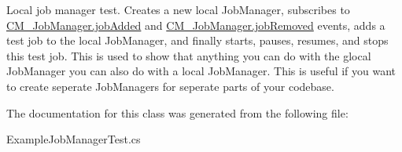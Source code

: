 Local job manager test. Creates a new local Job\+Manager, subscribes to \hyperlink{class_c_m___job_manager_a0f3c4dff8b782e1b64abcbb7dc19cd8a}{C\+M\+\_\+\+Job\+Manager.\+job\+Added} and \hyperlink{class_c_m___job_manager_a3a24d267ce0e6a09a2cf8f13429f2b73}{C\+M\+\_\+\+Job\+Manager.\+job\+Removed} events, adds a test job to the local Job\+Manager, and finally starts, pauses, resumes, and stops this test job. This is used to show that anything you can do with the glocal Job\+Manager you can also do with a local Job\+Manager. This is useful if you want to create seperate Job\+Managers for seperate parts of your codebase. 



The documentation for this class was generated from the following file\+:\begin{DoxyCompactItemize}
\item 
Example\+Job\+Manager\+Test.\+cs\end{DoxyCompactItemize}
